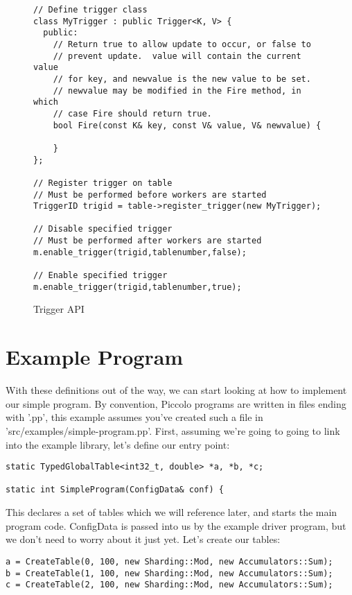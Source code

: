 \documentclass[10pt]{article}
\newcommand{\p}{Piccolo\xspace}
\begin{document}
 \begin{figure}[h!]
\begin{lstlisting}
// Define trigger class
class MyTrigger : public Trigger<K, V> {
  public:
    // Return true to allow update to occur, or false to
    // prevent update.  value will contain the current value
    // for key, and newvalue is the new value to be set.
    // newvalue may be modified in the Fire method, in which
    // case Fire should return true.
    bool Fire(const K& key, const V& value, V& newvalue) {

    }
};

// Register trigger on table
// Must be performed before workers are started
TriggerID trigid = table->register_trigger(new MyTrigger);

// Disable specified trigger
// Must be performed after workers are started
m.enable_trigger(trigid,tablenumber,false);

// Enable specified trigger
m.enable_trigger(trigid,tablenumber,true);

\end{lstlisting}
\caption{\sffamily Trigger API}
\label{fig:trigapi}
\end{figure}

\section{Example Program}
With these definitions out of the way, we can start looking at how to implement
our simple program.  By convention, \p programs are written in files ending with
'.pp', this example assumes you've created such a file in
'src/examples/simple-program.pp'.  First, assuming we're going to going to link
into the example library, let's define our entry point:

\begin{lstlisting}
static TypedGlobalTable<int32_t, double> *a, *b, *c;

static int SimpleProgram(ConfigData& conf) {
\end{lstlisting} 

This declares a set of tables which we will reference later, and starts the main
program code. {\ttfamily ConfigData} is passed into us by the example driver
program, but we don't need to worry about it just yet.  Let's create our tables:

\begin{lstlisting}
a = CreateTable(0, 100, new Sharding::Mod, new Accumulators::Sum);
b = CreateTable(1, 100, new Sharding::Mod, new Accumulators::Sum);
c = CreateTable(2, 100, new Sharding::Mod, new Accumulators::Sum);
\end{lstlisting}
\end{document}
